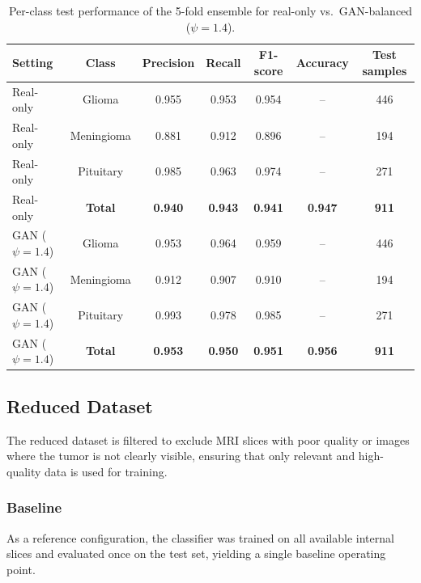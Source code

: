 \begin{table}[H]
\centering
\small
\caption{Per-class test performance of the 5-fold ensemble for real-only vs.\ GAN-balanced ($\psi=1.4$).}
\label{tab:ensemble5k_perclass_real_vs_gan14}
\begin{tabular}{lcccccc}
\toprule
Setting & Class & Precision & Recall & F1-score & Accuracy & Test samples \\
\midrule
Real-only        & Glioma     & 0.955 & 0.953 & 0.954 & --     & 446 \\
Real-only        & Meningioma & 0.881 & 0.912 & 0.896 & --     & 194 \\
Real-only        & Pituitary  & 0.985 & 0.963 & 0.974 & --     & 271 \\
Real-only        & \textbf{Total} 
                 & \textbf{0.940} & \textbf{0.943} & \textbf{0.941} & \textbf{0.947} & \textbf{911} \\
\midrule
GAN ($\psi=1.4$) & Glioma     & 0.953 & 0.964 & 0.959 & --     & 446 \\
GAN ($\psi=1.4$) & Meningioma & 0.912 & 0.907 & 0.910 & --     & 194 \\
GAN ($\psi=1.4$) & Pituitary  & 0.993 & 0.978 & 0.985 & --     & 271 \\
GAN ($\psi=1.4$) & \textbf{Total} 
                 & \textbf{0.953} & \textbf{0.950} & \textbf{0.951} & \textbf{0.956} & \textbf{911} \\
\bottomrule
\end{tabular}
\end{table}

\subsection{Reduced Dataset}

The reduced dataset is filtered to exclude MRI slices with poor quality or images where the tumor is not clearly visible, ensuring that only relevant and high-quality data is used for training.

\subsubsection{Baseline}

As a reference configuration, the classifier was trained on all available internal slices and evaluated once on the test set, yielding a single baseline operating point.





